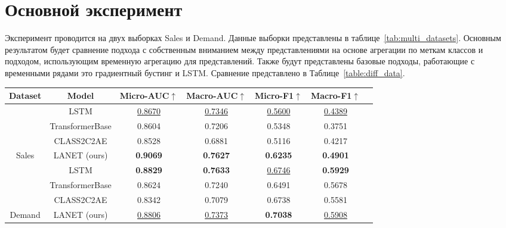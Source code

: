 \documentclass[a4paper, 12pt]{article} %
\begin{document}
 

\section{Основной эксперимент}
Эксперимент проводится на двух выборках Sales и Demand. Данные выборки представлены в таблице~\ref{tab:multi_datasets}. Основным результатом будет сравнение подхода  с собственным вниманием между представлениями на основе агрегации по меткам классов и подходом, использующим временную агрегацию для представлений. Также будут представлены базовые подходы, работающие с временными рядами это градиентный бустинг и LSTM. Сравнение представлено в Таблице~\ref{table:diff_data}.  

\begin{table*}[t] %
\centering
\small
\begin{tabular}{ccccccc}
\hline
Dataset & Model & Micro-AUC$\uparrow$ & Macro-AUC$\uparrow$ & Micro-F1$\uparrow$ & Macro-F1$\uparrow$\\
\hline
& LSTM & \underline{0.8670} & \underline{0.7346} & \underline{0.5600} & \underline{0.4389} \\
& TransformerBase     & 0.8604 & 0.7206 & 0.5348 & 0.3751 \\
& CLASS2C2AE          & 0.8528 & 0.6881 & 0.5116 & 0.4217 \\
\multirow{-5}{*}{Sales} & LANET (ours) & \textbf{0.9069} & \textbf{0.7627} & \textbf{0.6235} & \textbf{0.4901} \\ \hline

& LSTM & \textbf{0.8829} & \textbf{0.7633} & \underline{0.6746} & \textbf{0.5929} \\
& TransformerBase & 0.8624  & 0.7240 & 0.6491 & 0.5678 \\
& CLASS2C2AE & 0.8342  & 0.7079 & 0.6738 & 0.5581\\
\multirow{-5}{*}{Demand} & LANET (ours) & \underline{0.8806} & \underline{0.7373} & \textbf{0.7038} & \underline{0.5908} \\ \hline


\end{tabular}
\centering
\caption{Сравнение нашего метода LANET с базовыми данными по двум различным наборам данных. Выделены лучшие значения, а значения вторые по рангу подчеркнуты.
}
\label{table:diff_data}
\end{table*}
\end{document}
